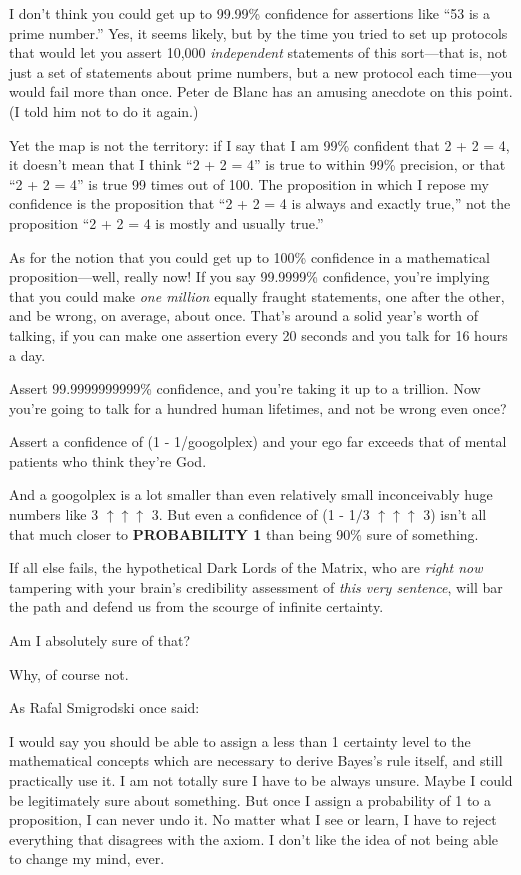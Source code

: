{
 I don't think you could get up to 99.99\%
confidence for assertions like ``53 is a prime
number.'' Yes, it seems likely, but by the time you
tried to set up protocols that would let you assert 10,000
\textit{independent} statements of this sort---that is, not just a set
of statements about prime numbers, but a new protocol each time---you
would fail more than once. Peter de Blanc has an amusing anecdote on
this point. (I told him not to do it again.)}

{
 Yet the map is not the territory: if I say that I am 99\%
confident that 2 + 2 = 4, it doesn't mean that I think
``2 + 2 = 4'' is true to within 99\%
precision, or that ``2 + 2 = 4'' is
true 99 times out of 100. The proposition in which I repose my
confidence is the proposition that ``2 + 2 = 4 is
always and exactly true,'' not the proposition
``2 + 2 = 4 is mostly and usually
true.''}

{
 As for the notion that you could get up to 100\% confidence in a
mathematical proposition---well, really now! If you say 99.9999\%
confidence, you're implying that you could make
\textit{one million} equally fraught statements, one after the other,
and be wrong, on average, about once. That's around a
solid year's worth of talking, if you can make one
assertion every 20 seconds and you talk for 16 hours a day.}

{
 Assert 99.9999999999\% confidence, and you're
taking it up to a trillion. Now you're going to talk
for a hundred human lifetimes, and not be wrong even once?}

{
 Assert a confidence of (1 - 1/googolplex) and your ego far exceeds
that of mental patients who think they're God.}

{
 And a googolplex is a lot smaller than even relatively small
inconceivably huge numbers like 3 $\uparrow \uparrow \uparrow $ 3. But
even a confidence of (1 - 1$/$3 $\uparrow \uparrow \uparrow $ 3)
isn't all that much closer to \textbf{PROBABILITY 1}
than being 90\% sure of something.}

{
 If all else fails, the hypothetical Dark Lords of the Matrix, who
are \textit{right now} tampering with your brain's
credibility assessment of \textit{this very sentence}, will bar the
path and defend us from the scourge of infinite certainty.}

{
 Am I absolutely sure of that?}

{
 Why, of course not.}

{
 As Rafal Smigrodski once said:}

{
 I would say you should be able to assign a less than 1 certainty
level to the mathematical concepts which are necessary to derive
Bayes's rule itself, and still practically use it. I am
not totally sure I have to be always unsure. Maybe I could be
legitimately sure about something. But once I assign a probability of 1
to a proposition, I can never undo it. No matter what I see or learn, I
have to reject everything that disagrees with the axiom. I
don't like the idea of not being able to change my
mind, ever.}

